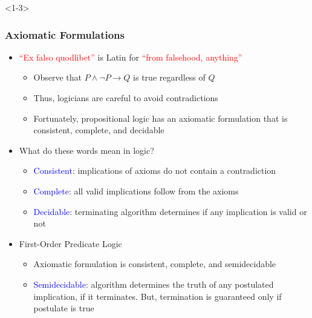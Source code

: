 \documentclass[10pt,english,aspectratio=169]{beamer}
\begin{document}
\begin{frame}<1-3> \frametitle{Axiomatic Formulations}

\begin{itemize}
\setlength\itemsep{3mm}
\item<1-> \textcolor{red}{``Ex falso quodlibet''} is Latin for \textcolor{red}{``from falsehood, anything''} \vspace{1mm}
\begin{itemize}
 \setlength\itemsep{1.5mm}
 \item Observe that $P \wedge \neg P \rightarrow Q$ is true regardless of $Q$
 \item Thus, logicians are careful to avoid contradictions
 \item Fortunately, propositional logic has an axiomatic formulation that is consistent, complete, and decidable
\end{itemize} 

\item<2-> What do these words mean in logic? \vspace{1mm}
\begin{itemize} 
 \setlength\itemsep{1.5mm}
 \item \textcolor{blue}{Consistent}: implications of axioms do not contain a contradiction
 \item \textcolor{blue}{Complete}: all valid implications follow from the axioms
 \item \textcolor{blue}{Decidable}: terminating algorithm determines if any implication is valid or not$\!\!\!\!\!\!\!$
\end{itemize}

\item<3-> First-Order Predicate Logic \vspace{1mm}
\begin{itemize} 
 \setlength\itemsep{1.5mm}
 \item Axiomatic formulation is consistent, complete, and semidecidable
 \item \textcolor{blue}{Semidecidable}:  algorithm determines the truth of any postulated implication, if it terminates.  But, termination is guaranteed only if postulate is true
\end{itemize}
\end{itemize}


\end{frame}
\end{document}
